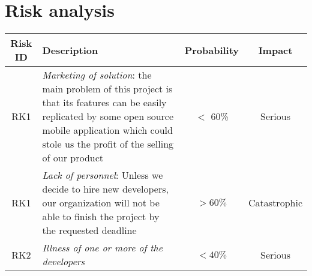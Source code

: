 \chapter{Risk analysis}
\begin{table}[H]
\centering
\begin{tabular}{c | p{} | c | c}
\textbf{Risk ID} & \textbf{Description} & \textbf{Probability} & \textbf{Impact} \\ \hline
RK1 & \textit{Marketing of solution}: the main problem of this project is that its features can be easily replicated by some open source mobile application which could stole us the profit of the selling of our product & $<$ 60\% & Serious \\ \hline
RK1 & \textit{Lack of personnel}: Unless we decide to hire new developers, our organization will not be able to finish the project by the requested deadline & $>60 \%$ & Catastrophic \\ \hline
RK2 & \textit{Illness of one or more of the developers} & $< 40 \%$ & Serious
\end{tabular}
\end{table}